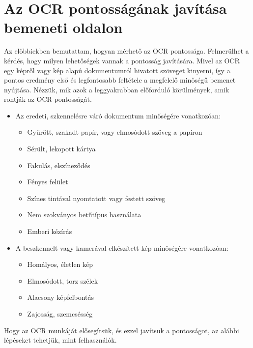 \documentclass[12pt]{report}
\begin{document}
\section{Az OCR pontosságának javítása bemeneti oldalon}

Az előbbiekben bemutattam, hogyan mérhető az OCR pontossága. Felmerülhet a kérdés, hogy milyen lehetőségek vannak a pontosság javítására. Mivel az OCR egy képről vagy kép alapú dokumentumról hivatott szöveget kinyerni, így a pontos eredmény első és legfontosabb feltétele a megfelelő minőségű bemenet nyújtása. Nézzük, mik azok a leggyakrabban előforduló körülmények, amik rontják az OCR pontosságát.

\begin{itemize}
    \item Az eredeti, szkennelésre váró dokumentum minőségére vonatkozóan:
    \begin{itemize}
        \item Gyűrött, szakadt papír, vagy elmosódott szöveg a papíron
        \item Sérült, lekopott kártya
        \item Fakulás, elszíneződés
        \item Fényes felület
        \item Színes tintával nyomtatott vagy festett szöveg
        \item Nem szokványos betűtípus használata
        \item Emberi kézírás
    \end{itemize}
    \item A beszkennelt vagy kamerával elkészített kép minőségére vonatkozóan:
    \begin{itemize}
        \item Homályos, életlen kép
        \item Elmosódott, torz szélek
        \item Alacsony képfelbontás
        \item Zajosság, szemcsésség
    \end{itemize}
\end{itemize}

Hogy az OCR munkáját elősegítsük, és ezzel javítsuk a pontosságot, az alábbi lépéseket tehetjük, mint felhasználók.
\end{document}

